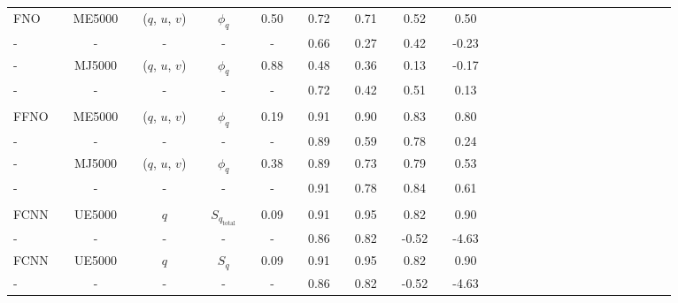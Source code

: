 \begin{table}[H]
\begin{tabular}{llclclclclclclclclclclclclclclcl}
FNO         &  & ME5000           &  & ($q$, $u$, $v$)  &  & $\phi_q$ &  & 0.50                 &  & 0.72             &  & 0.71             &  & 0.52            &  & 0.50            \\ \rowcolor{Gray}
-     		&  & -                &  & -				&  & -        &  & -                     &  & 0.66             &  & 0.27             &  & 0.42            &  & -0.23             \\ 
-     		&  & MJ5000           &  & ($q$, $u$, $v$)  &  & $\phi_q$ &  & 0.88                 &  & 0.48             &  & 0.36             &  & 0.13            &  & -0.17             \\ \rowcolor{Gray}
-     		&  & -                &  & -				&  & -        &  & -                     &  & 0.72             &  & 0.42             &  & 0.51            &  & 0.13             \\ 
\hline \\[-1.4em]
FFNO        &  & ME5000           &  & ($q$, $u$, $v$)  &  & $\phi_q$ &  & 0.19                 &  & 0.91             &  & 0.90             &  & 0.83            &  & 0.80            \\ \rowcolor{Gray}
-     		&  & -                &  & -				&  & -        &  & -                     &  & 0.89             &  & 0.59             &  & 0.78            &  & 0.24            \\ 
-     		&  & MJ5000           &  & ($q$, $u$, $v$)  &  & $\phi_q$ &  & 0.38                 &  & 0.89             &  & 0.73             &  & 0.79            &  & 0.53            \\ \rowcolor{Gray}
-     		&  & -                &  & -				&  & -        &  & -                     &  & 0.91             &  & 0.78             &  & 0.84            &  & 0.61            \\ [0.2em]
\hline \\[-1.4em]
FCNN      &  & UE5000      &  & $q$       &   & $S_{q_{\text{total}}}$     &  & 0.09      &  & 0.91       &  & 0.95     &  & 0.82      &  & 0.90         \\ \rowcolor{Blue}
-     		&  & -                  &  & -            &   &  -                                       &  &  -           &  & 0.86      &  & 0.82     &  & -0.52     &  & -4.63        \\ 
FCNN      &  & UE5000      &  & $q$       &   & $S_q$                               &  & 0.09      &  & 0.91       &  & 0.95     &  & 0.82      &  & 0.90             \\ \rowcolor{Blue}
-     		&  & -                  &  & -            &   &  -                                       &  &  -           &  & 0.86      &  & 0.82      &  & -0.52    &  & -4.63          \\ 

\end{tabular}
\end{table}
